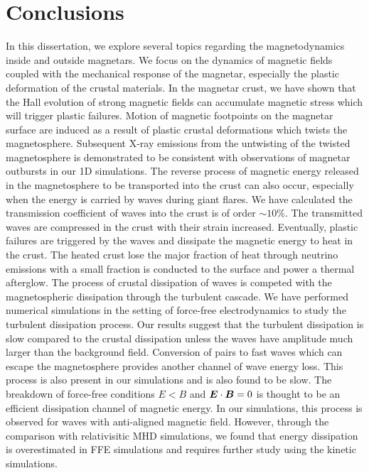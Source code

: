 
\chapter{Conclusions}
\label{chap:conclusions}

In this dissertation, we explore several topics regarding the magnetodynamics inside and outside magnetars. 
We focus on the dynamics of magnetic fields coupled with the mechanical response of the magnetar, especially the plastic deformation of the crustal materials. 
In the magnetar crust, we have shown that the Hall evolution of strong magnetic fields can accumulate magnetic stress which will trigger plastic failures.
Motion of magnetic footpoints on the magnetar surface are induced as a result of plastic crustal deformations which twists the magnetosphere.
Subsequent X-ray emissions from the untwisting of the twisted magnetosphere is demonstrated to be consistent with observations of magnetar outbursts in our 1D simulations.
The reverse process of magnetic energy released in the magnetosphere to be transported into the crust can also occur, especially when the energy is carried by \alfven waves during giant flares.
We have calculated the transmission coefficient of \alfven waves into the crust is of order $\sim 10\%$.
The transmitted waves are compressed in the crust with their strain increased.
Eventually, plastic failures are triggered by the waves and dissipate the magnetic energy to heat in the crust.
The heated crust lose the major fraction of heat through neutrino emissions with a small fraction is conducted to the surface and power a thermal afterglow.
The process of crustal dissipation of \alfven waves is competed with the magnetospheric dissipation through the turbulent cascade.
We have performed numerical simulations in the setting of force-free electrodynamics to study the turbulent dissipation process.
Our results suggest that the turbulent dissipation is slow compared to the crustal dissipation unless the waves have amplitude much larger than the background field.
Conversion of \alfven pairs to fast waves which can escape the magnetosphere provides another channel of wave energy loss.
This process is also present in our simulations and is also found to be slow.
The breakdown of force-free conditions $E<B$ and $\boldsymbol{E}\cdot\boldsymbol{B}=0$ is thought to be an efficient dissipation channel of magnetic energy.
In our simulations, this process is observed for \alfven waves with anti-aligned magnetic field.
However, through the comparison with relativisitic MHD simulations, we found that energy dissipation is overestimated in FFE simulations and requires further study using the kinetic simulations.

